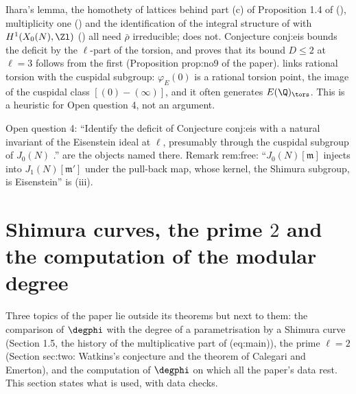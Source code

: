 \begin{remark}\label{rem:moddeg:eisenstein-and-the-paper}
Ihara's lemma, the homothety of lattices behind part (c) of Proposition 1.4 of \cite{DFG04} (), multiplicity one () and the identification of the integral structure of \cite{DFG04} with $H^1(X_0(N),\Zl)$
() all need $\bar\rho$ irreducible;  does not. Conjecture conj:eis bounds the deficit by the $\ell$-part of the torsion, and
 proves that its bound $D\le2$ at $\ell=3$ follows from the first (Proposition prop:no9 of the paper).  links rational torsion with the
cuspidal subgroup: $\varphi_E(0)$ is a rational torsion point, the image of the cuspidal class $[(0)-(\infty)]$, and it often generates $E(\Q)_{\tors}$. This is a heuristic for Open question 4, not an
argument.
\end{remark}

\begin{paperlink}\label{pl:moddeg:eis}
Open question 4: ``Identify the deficit of Conjecture conj:eis with a natural invariant of the Eisenstein ideal at $\ell$, presumably through the cuspidal subgroup of $J_0(N)$ \cite{Mazur77}.''
 are the objects named there. Remark rem:free: ``$J_0(N)[\mathfrak m]$ injects into
$J_1(N)[\mathfrak m']$ under the pull-back map, whose kernel, the Shimura subgroup, is Eisenstein'' is (iii).
\end{paperlink}

\section[Shimura curves, the prime 2, computing the degree]{Shimura curves, the prime \texorpdfstring{$2$}{2} and the computation of the modular degree}\label{sec:moddeg:shimura-two}

Three topics of the paper lie outside its theorems but next to them: the comparison of $\degphi$ with the degree of a parametrisation by a Shimura curve (Section 1.5, the history of the
multiplicative part of (eq:main)), the prime $\ell=2$ (Section sec:two: Watkins's conjecture and the theorem of Calegari and Emerton), and the computation of $\degphi$ on which all the
paper's data rest. This section states what is used, with data checks.

